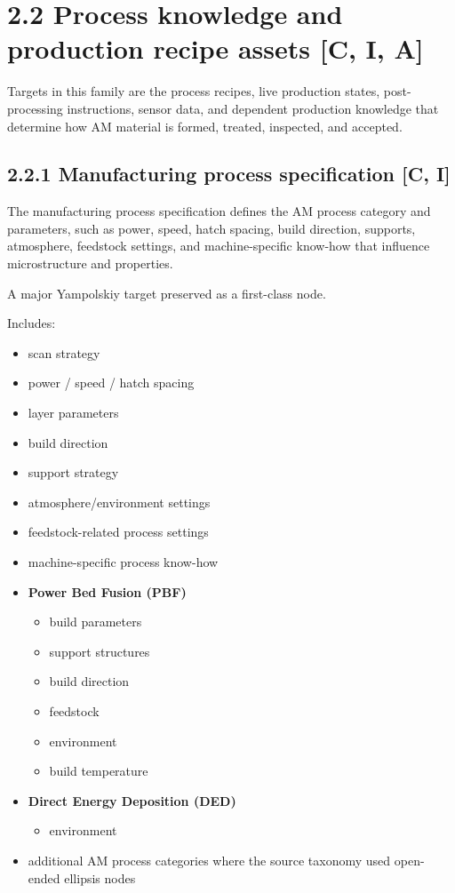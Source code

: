 \documentclass[10pt,a4paper,oneside]{report}
\begin{document}
\section{2.2 Process knowledge and production recipe assets [C, I, A]}


Targets in this family are the process recipes, live production states, post-processing instructions, sensor data, and dependent production knowledge that determine how AM material is formed, treated, inspected, and accepted.


\subsection{2.2.1 Manufacturing process specification [C, I]}


The manufacturing process specification defines the AM process category and parameters, such as power, speed, hatch spacing, build direction, supports, atmosphere, feedstock settings, and machine-specific know-how that influence microstructure and properties.

A major Yampolskiy target preserved as a first-class node.

Includes:

\begin{itemize}
\item scan strategy
\item power / speed / hatch spacing
\item layer parameters
\item build direction
\item support strategy
\item atmosphere/environment settings
\item feedstock-related process settings
\item machine-specific process know-how
\item \textbf{Power Bed Fusion (PBF)}
\begin{itemize}
\item build parameters
\item support structures
\item build direction
\item feedstock
\item environment
\item build temperature
\end{itemize}
\item \textbf{Direct Energy Deposition (DED)}
\begin{itemize}
\item environment
\end{itemize}
\item additional AM process categories where the source taxonomy used open-ended ellipsis nodes
\end{itemize}
\end{document}
